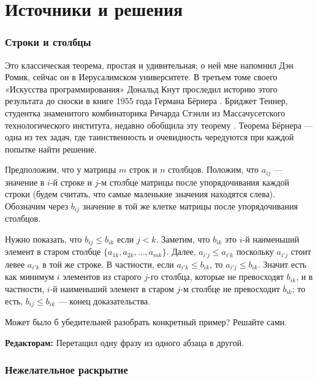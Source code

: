 \section*{Источники и решения}

\subsubsection*{Строки и столбцы}

Это классическая теорема, простая и удивительная; о ней мне напомнил Дэн Ромик, сейчас он в Иерусалимском университете.
В третьем томе своего «Искусства программирования» \cite{41} Дональд Кнут проследил историю этого результата до сноски в книге 1955 года Германа Бёрнера \cite{7}.
Бриджет Теннер, студентка знаменитого комбинаторика Ричарда Стэнли из Массачусетского технологического института, недавно обобщила эту теорему \cite{57}.
Теорема Бёрнера --- одна из тех задач, где таинственность и очевидность чередуются при каждой попытке найти решение.

Предположим, что у матрицы $m$ строк и $n$ столбцов.
Положим, что $a_{ij}$ --- значение в $i$-й строке и $j$-м столбце матрицы
после упорядочивания каждой строки (будем считать, что самые маленькие значения находятся слева).
Обозначим через $b_{ij}$ значение в той же клетке матрицы после упорядочивания столбцов.

Нужно показать, что $b_{ij} \le b_{ik}$ если $j < k$.
Заметим, что $b_{ik}$ это $i$-й наименьший элемент в старом столбце $\{a_{1k}, a_{2k}, \dots, a_{mk}\}$.
Далее, $a_{i'j}\le a_{i'k}$ поскольку $a_{i'j}$ стоит левее $a_{i'k}$ в той же строке.
В частности, если $a_{i'k}\le b_{ik}$, то $a_{i'j}\le b_{ik}$.
Значит есть как минимум $i$ элементов из старого $j$-го столбца, которые не превосходят $b_{ik}$,
и в частности, $i$-й наименьший элемент в старом $j$-м столбце не превосходит $b_{ik}$;
то есть, $b_{ij} \le b_{ik}$ --- конец доказательства.

Может было б убедительней разобрать конкретный пример?
Решайте сами.


\begin{addedbytheeditors}
\textbf{Редакторам:} Перетащил одну фразу из одного абзаца в другой.
\end{addedbytheeditors}

\subsubsection*{Нежелательное раскрытие}

